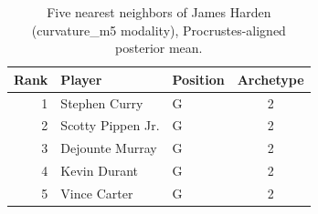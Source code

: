 \begin{table}[htbp]
  \centering\small
  \begin{tabular}{rllc}
    \toprule
    Rank & Player & Position & Archetype \\
    \midrule
    1 & Stephen Curry & G & 2 \\
    2 & Scotty Pippen Jr. & G & 2 \\
    3 & Dejounte Murray & G & 2 \\
    4 & Kevin Durant & G & 2 \\
    5 & Vince Carter & G & 2 \\
    \bottomrule
  \end{tabular}
  \caption{Five nearest neighbors of James Harden (curvature_m5 modality), Procrustes-aligned posterior mean.}
  \label{tab:James_Harden_neighbors_curvature_m5}
\end{table}

